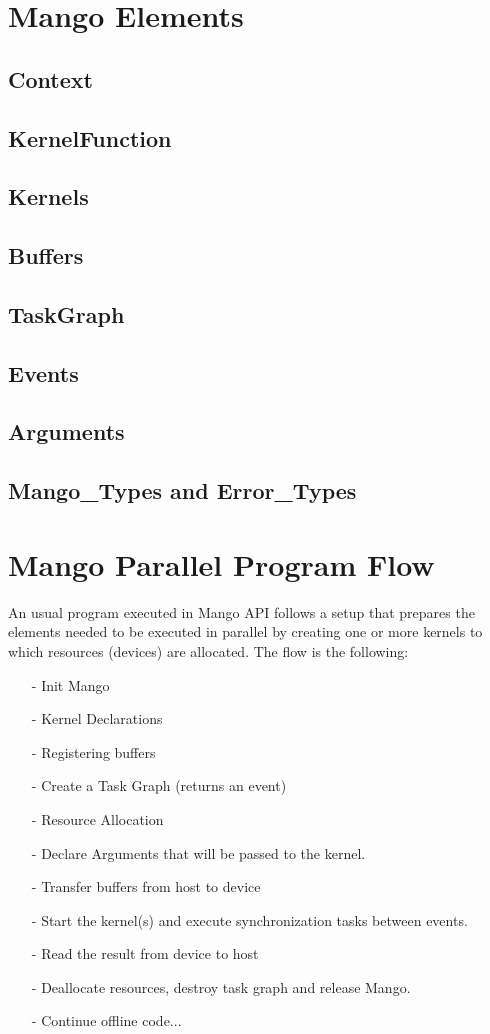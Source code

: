 \documentclass[a4paper]{article}
\begin{document}
\section{Mango Elements}
\subsection{Context}
\subsection{KernelFunction}
\subsection{Kernels}
\subsection{Buffers}
\subsection{TaskGraph}
\subsection{Events}
\subsection{Arguments}
\subsection{Mango\_Types and Error\_Types}

\newpage
\section{Mango Parallel Program Flow}
An usual program executed in Mango API follows a setup that prepares the elements needed to be executed in parallel by creating one or more kernels to which resources (devices) are allocated.
The flow is the following:
\begin{itemize}
	\item[-] Init Mango
        	\item[-] Kernel Declarations
	\item[-] Registering buffers
	\item[-] Create a Task Graph (returns an event)
	\item[-] Resource Allocation
	\item[-] Declare Arguments that will be passed to the kernel.
	\item[-] Transfer buffers from host to device 
	\item[-] Start the kernel(s) and execute synchronization tasks between events.
	\item[-] Read the result from device to host
	\item[-] Deallocate resources, destroy task graph and release Mango.
	\item[-] Continue offline code... 
\end{itemize} 
\end{document}
